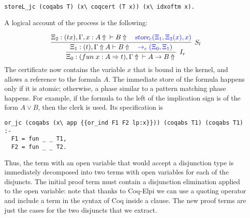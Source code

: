 \documentclass{llncs}
\begin{document}
{{\small
\begin{lstlisting}
storeL_jc (coqabs T) (x\ coqcert (T x)) (x\ idxoftm x).
\end{lstlisting}
}

A logical account of the process is the following:

\[
  \infer[I_r]{\Xi_0 : (fun\; x : A \Rightarrow t), \jUnfG{\null}{A\to B }}
             {\infer[S_l]{\Xi_1 : (t), \jUnfG{A}{B}\quad
              \blue{\arrClerk{\Xi_0}{\Xi_1}}}{
                \Xi_2 : (t x), \jUnf{\Gamma, x : A}{\null}{B}{\null} \quad \blue{\storeClerk{\Xi_1}{\Xi_2(x)}{x}}
              }
             }
\]
The certificate now contains the variable $x$ that is bound in the kernel, and allows
a reference to the formula $A$. The immediate store of the formula happens only if it is
atomic; otherwise, a phase similar to a pattern matching phase happens.
For example, if the formula to the left of the implication sign is of the form
$A \lor B$, then the  clerk is used. Its specification is
{\small
\begin{lstlisting}
or_jc (coqabs (x\ app {{or_ind F1 F2 lp:x}})) (coqabs T1) (coqabs T1) :-
  F1 = fun _ _ T1,
  F2 = fun _ _ T2.
\end{lstlisting}
}

Thus, the term with an open variable that would accept a disjunction type is
immediately decomposed into two terms with open variables for each of the
disjuncts. The initial proof term must contain a disjunction elimination
applied to the open variable: note that thanks to Coq-Elpi we can use a quoting operator and include
a term in the syntax of Coq inside a \lP clause. The new proof terms are just
the cases for the two disjuncts that we extract.




}
\end{document}
